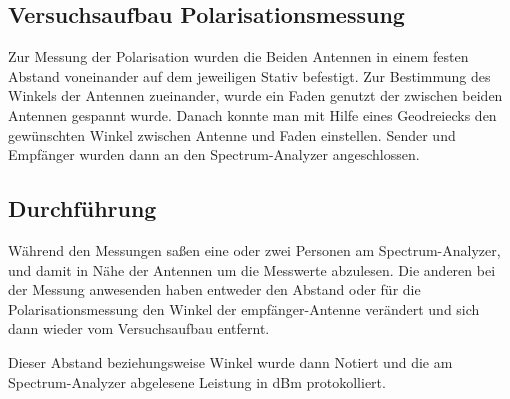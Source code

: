 \documentclass[titlepage,11pt,a4paper,ngerman]{article}
\begin{document}
\subsection{Versuchsaufbau Polarisationsmessung}

Zur Messung der Polarisation wurden die Beiden Antennen in einem festen Abstand voneinander auf dem jeweiligen Stativ befestigt. Zur Bestimmung des Winkels der Antennen zueinander, wurde ein Faden genutzt der zwischen beiden Antennen gespannt wurde. Danach konnte man mit Hilfe eines Geodreiecks den gewünschten Winkel zwischen Antenne und Faden einstellen. Sender und Empfänger wurden dann an den Spectrum-Analyzer angeschlossen.

\subsection{Durchführung}

Während den Messungen saßen eine oder zwei Personen am Spectrum-Analyzer, und damit in Nähe der Antennen um die Messwerte abzulesen. Die anderen bei der Messung anwesenden haben entweder den Abstand oder für die Polarisationsmessung den Winkel der empfänger-Antenne verändert und sich dann wieder vom Versuchsaufbau entfernt.\par
Dieser Abstand beziehungsweise Winkel wurde dann Notiert und die am Spectrum-Analyzer abgelesene Leistung in dBm protokolliert.
\end{document}
